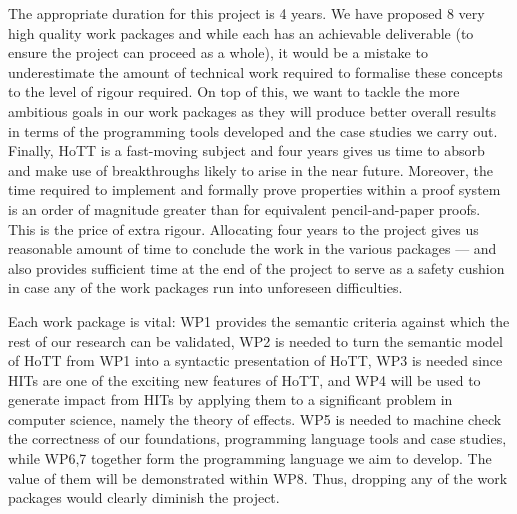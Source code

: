 \documentclass[a4paper,11pt]{article}
\begin{document}
 The appropriate duration for
this project is 4 years. We have proposed 8 very high quality work
packages and while each has an achievable deliverable
(to ensure the project can proceed as a whole), it would be a mistake
to underestimate the amount of technical work required to formalise
these concepts to the level of rigour required. On top of this, we
want to tackle the more ambitious goals in our work packages as they
will produce better overall results in terms of the programming tools
developed and the case studies we carry out. Finally, HoTT is a
fast-moving subject and four years gives us time to absorb and make use
of breakthroughs likely to arise in the near future.  Moreover, the
time required to implement and formally prove properties within a
proof system is an order of magnitude greater than for equivalent
pencil-and-paper proofs. This is the price of extra rigour. Allocating
four years to the project gives us reasonable amount of time to conclude
the work in the various packages --- and also provides sufficient time
at the end of the project to serve as a safety cushion in case any of
the work packages run into unforeseen difficulties.


\noindent Each work package is vital: WP1 provides
the semantic criteria against which the rest of our
research can be validated, WP2 is needed to turn the semantic model of
HoTT from WP1 into a syntactic presentation of HoTT, WP3 is needed
since HITs are one of the exciting new features of HoTT, and WP4 will
be used to generate impact from HITs by applying them to a significant
problem in computer science, namely the theory of effects. WP5 is
needed to machine check the correctness of our foundations,
programming language tools and case studies, while WP6,7
together form the programming language we aim to develop. The
value of them will be demonstrated within WP8.
Thus, dropping any of the work packages would clearly diminish the
project.

\vspace{0.02in}
\end{document}
